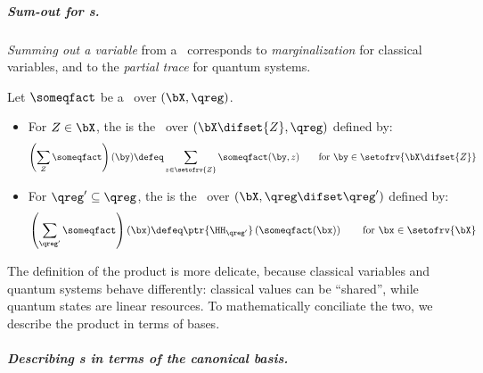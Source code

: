 \subparagraph*{Sum-out for \qfactor s.}
\emph{Summing out a variable} from a \qfactor\ corresponds to \emph{marginalization} for classical variables, and to the \emph{partial trace} for quantum systems.
\begin{definition}
\label{def:sum}
Let $\someqfact$ be a \qfactor\ over $(\bX,\qreg)$. 
\begin{itemize}
\item
For $Z \in \bX$, the  is the \qfactor\ over $(\bX \difset\{Z\},\qreg )$ defined by:
\begin{equation*}
\left(\sum_Z \someqfact\right) (\by) \defeq \sum_{z\in\setofrv{Z}} \someqfact (\by,z)
\qquad
\text{for $\by \in \setofrv{\bX \difset\{Z\}}$}
\end{equation*}
\item
For $\qreg' \subseteq \qreg $, the  is the \qfactor\ over $(\bX ,\qreg \difset\qreg')$ defined by:
\begin{equation*}
\left(\sum_{\qreg'} \someqfact\right) (\bx) \defeq \ptr{\HH_{\qreg'}}\left(\someqfact (\bx)\right)
\qquad
\text{for $\bx \in \setofrv{\bX}$}
\end{equation*}
\end{itemize}
\end{definition}

The definition of the product is more delicate, because classical variables and quantum systems behave differently: classical values can be ``shared'', while quantum states are linear resources.
To mathematically conciliate the two, we describe the product in terms of bases.

\subparagraph{Describing \qfactor s in terms of the canonical basis.}

